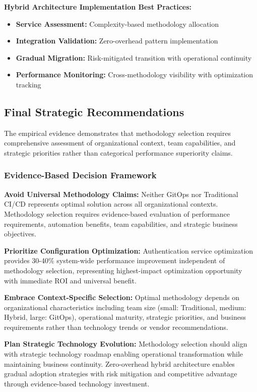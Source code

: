\textbf{Hybrid Architecture Implementation Best Practices:}
\begin{itemize}
\item \textbf{Service Assessment:} Complexity-based methodology allocation
\item \textbf{Integration Validation:} Zero-overhead pattern implementation
\item \textbf{Gradual Migration:} Risk-mitigated transition with operational continuity
\item \textbf{Performance Monitoring:} Cross-methodology visibility with optimization tracking
\end{itemize}

\subsection{Final Strategic Recommendations}
\label{subsec:final_recommendations}

The empirical evidence demonstrates that methodology selection requires comprehensive assessment of organizational context, team capabilities, and strategic priorities rather than categorical performance superiority claims.

\subsubsection{Evidence-Based Decision Framework}

\textbf{Avoid Universal Methodology Claims:}
Neither GitOps nor Traditional CI/CD represents optimal solution across all organizational contexts. Methodology selection requires evidence-based evaluation of performance requirements, automation benefits, team capabilities, and strategic business objectives.

\textbf{Prioritize Configuration Optimization:}
Authentication service optimization provides 30-40\% system-wide performance improvement independent of methodology selection, representing highest-impact optimization opportunity with immediate ROI and universal benefit.

\textbf{Embrace Context-Specific Selection:}
Optimal methodology depends on organizational characteristics including team size (small: Traditional, medium: Hybrid, large: GitOps), operational maturity, strategic priorities, and business requirements rather than technology trends or vendor recommendations.

\textbf{Plan Strategic Technology Evolution:}
Methodology selection should align with strategic technology roadmap enabling operational transformation while maintaining business continuity. Zero-overhead hybrid architecture enables gradual adoption strategies with risk mitigation and competitive advantage through evidence-based technology investment.

